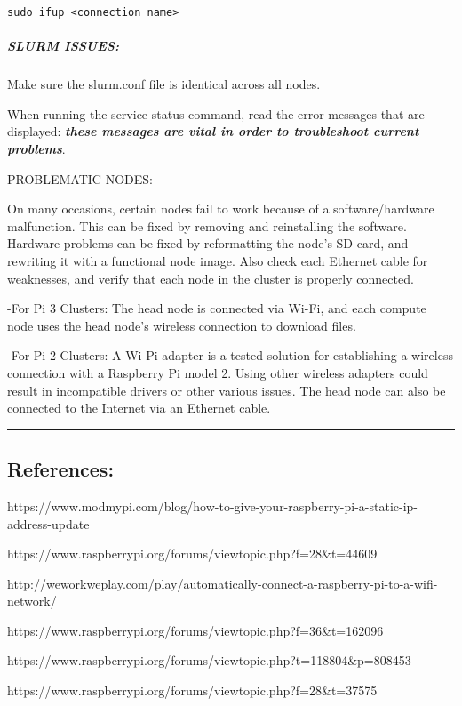 \documentclass[]{article}
\let\oldsubparagraph\subparagraph
\renewcommand{\subparagraph}[1]{\oldsubparagraph{#1}\mbox{}}
\begin{document}
\texttt{sudo\ ifup\ \textless{}connection\ name\textgreater{}}

\subparagraph{SLURM ISSUES:}\label{slurm-issues}

Make sure the slurm.conf file is identical across all nodes.

When running the service status command, read the error messages that
are displayed: \emph{\textbf{these messages are vital in order to
troubleshoot current problems}}.

PROBLEMATIC NODES:

On many occasions, certain nodes fail to work because of a
software/hardware malfunction. This can be fixed by removing and
reinstalling the software. Hardware problems can be fixed by
reformatting the node's SD card, and rewriting it with a functional node
image. Also check each Ethernet cable for weaknesses, and verify that
each node in the cluster is properly connected.

-For Pi 3 Clusters: The head node is connected via Wi-Fi, and each
compute node uses the head node's wireless connection to download files.

-For Pi 2 Clusters: A Wi-Pi adapter is a tested solution for
establishing a wireless connection with a Raspberry Pi model 2. Using
other wireless adapters could result in incompatible drivers or other
various issues. The head node can also be connected to the Internet via
an Ethernet cable.

\begin{center}\rule{0.5\linewidth}{\linethickness}\end{center}

\subsection{References:}\label{references}

https://www.modmypi.com/blog/how-to-give-your-raspberry-pi-a-static-ip-address-update

https://www.raspberrypi.org/forums/viewtopic.php?f=28\&t=44609

http://weworkweplay.com/play/automatically-connect-a-raspberry-pi-to-a-wifi-network/

https://www.raspberrypi.org/forums/viewtopic.php?f=36\&t=162096

https://www.raspberrypi.org/forums/viewtopic.php?t=118804\&p=808453

https://www.raspberrypi.org/forums/viewtopic.php?f=28\&t=37575
\end{document}
